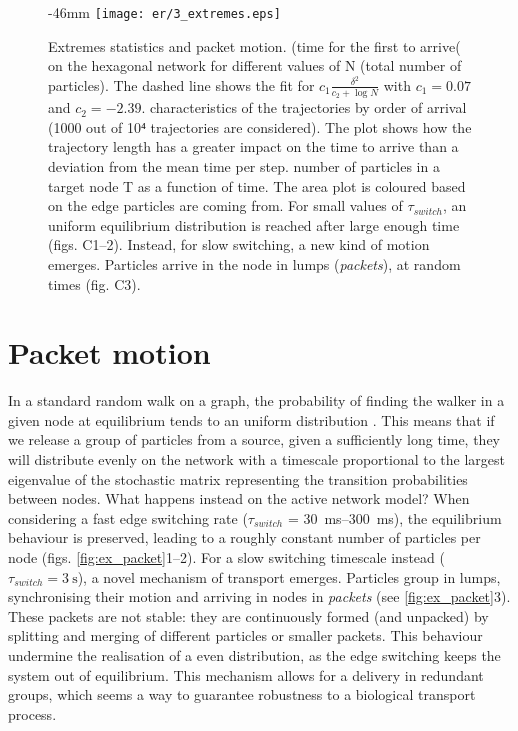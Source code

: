 \begin{figure}
  \begin{adjustwidth*}{}{-46mm}
    \texttt{[image: er/3\_extremes.eps]}%
    {{\label{fig:ex_efpt}}%
    {\label{fig:ex_traj}}%
    {\label{fig:ex_packet}}}%
    \caption{Extremes statistics and packet motion.
    \enspace {} (time for the first to arrive( on the hexagonal network for different values of N (total number of particles). The dashed line shows the fit for $c_1 \frac{\delta^2}{c_2 + \log N}$ with $c_1 = 0.07$ and $c_2 = -2.39$. \enspace characteristics of the trajectories by order of arrival (1000 out of 10⁴ trajectories are considered). The plot shows how the trajectory length has a greater impact on the time to arrive than a deviation from the mean time per step.
    \enspace number of particles in a target node T as a function of time. The area plot is coloured based on the edge particles are coming from. For small values of $\tau_{switch}$, an uniform equilibrium distribution is reached after large enough time (figs. C1--2). Instead, for slow switching, a new kind of motion emerges. Particles arrive in the node in lumps (\emph{packets}), at random times (fig. C3).\label{fig:ex}}
  \end{adjustwidth*}
\end{figure}

\section{Packet motion}

In a standard random walk on a graph, the probability of finding the walker in a given node at equilibrium tends to an uniform distribution . This means that if we release a group of particles from a source, given a sufficiently long time, they will distribute evenly on the network with a timescale proportional to the largest eigenvalue of the stochastic matrix representing the transition probabilities between nodes. What happens instead on the active network model? When considering a fast edge switching rate ($\tau_{switch}$ = \SIrange{30}{300}{\milli\second}), the equilibrium behaviour is preserved, leading to a roughly constant number of particles per node (figs. \ref{fig:ex_packet}1--2). For a slow switching timescale instead ($\tau_{switch} = \SI{3}{\second}$), a novel mechanism of transport emerges. Particles group in lumps, synchronising their motion and arriving in nodes in \emph{packets} (see \cref{fig:ex_packet}3). These packets are not stable: they are continuously formed (and unpacked) by splitting and merging of different particles or smaller packets. This behaviour undermine the realisation of a even distribution, as the edge switching keeps the system out of equilibrium. This mechanism allows for a delivery in redundant groups, which seems a way to guarantee robustness to a biological transport process.
